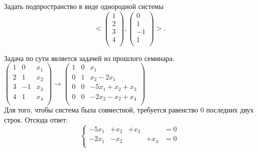 \begin{prim}
	Задать подпространство в виде однородной системы
	$$
	<
	\begin{pmatrix}
	1\\
	2\\
	3\\
	4\\
	\end{pmatrix}
	,
	\begin{pmatrix}
	0\\
	1\\
	-1\\
	1\\
	\end{pmatrix}
	>.
	$$
\end{prim}
Задача по сути является задачей из прошлого семинара:\\
$
\left(
\begin{array}{cc|c}
1 & 0 & x_1\\
2 & 1 & x_2\\
3 & -1 & x_3\\
4 & 1 & x_4\\
\end{array}
\right)
\rightarrow
\left(
\begin{array}{cc|c}
1 & 0 & x_1\\
0 & 1 & x_2-2x_1\\
0 & 0 & -5x_1+x_2+x_3\\
0 & 0 & -2x_2-x_2+x_4\\
\end{array}
\right)
$\\
Для того, чтобы система была совместной, требуется равенство 0 последних двух строк. Отсюда ответ:
$$
\left\{
\begin{array}{rrrrl}
-5x_1&+x_2&+x_3&&=0\\
-2x_1&-x_2&&+x_4&=0\\
\end{array}
\right.
$$
